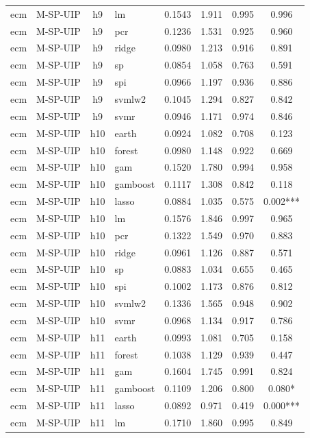 \begin{ThreePartTable}
\begin{longtable}[t]{llclcccc}
ecm & M-SP-UIP & h9 & lm & 0.1543 & 1.911 & 0.995 & 0.996\\
ecm & M-SP-UIP & h9 & pcr & 0.1236 & 1.531 & 0.925 & 0.960\\
ecm & M-SP-UIP & h9 & ridge & 0.0980 & 1.213 & 0.916 & 0.891\\
ecm & M-SP-UIP & h9 & sp & 0.0854 & 1.058 & 0.763 & 0.591\\
ecm & M-SP-UIP & h9 & spi & 0.0966 & 1.197 & 0.936 & 0.886\\
ecm & M-SP-UIP & h9 & svmlw2 & 0.1045 & 1.294 & 0.827 & 0.842\\
ecm & M-SP-UIP & h9 & svmr & 0.0946 & 1.171 & 0.974 & 0.846\\
\addlinespace
ecm & M-SP-UIP & h10 & earth & 0.0924 & 1.082 & 0.708 & 0.123\\
ecm & M-SP-UIP & h10 & forest & 0.0980 & 1.148 & 0.922 & 0.669\\
ecm & M-SP-UIP & h10 & gam & 0.1520 & 1.780 & 0.994 & 0.958\\
ecm & M-SP-UIP & h10 & gamboost & 0.1117 & 1.308 & 0.842 & 0.118\\
ecm & M-SP-UIP & h10 & lasso & 0.0884 & 1.035 & 0.575 & 0.002***\\
ecm & M-SP-UIP & h10 & lm & 0.1576 & 1.846 & 0.997 & 0.965\\
ecm & M-SP-UIP & h10 & pcr & 0.1322 & 1.549 & 0.970 & 0.883\\
ecm & M-SP-UIP & h10 & ridge & 0.0961 & 1.126 & 0.887 & 0.571\\
ecm & M-SP-UIP & h10 & sp & 0.0883 & 1.034 & 0.655 & 0.465\\
ecm & M-SP-UIP & h10 & spi & 0.1002 & 1.173 & 0.876 & 0.812\\
ecm & M-SP-UIP & h10 & svmlw2 & 0.1336 & 1.565 & 0.948 & 0.902\\
ecm & M-SP-UIP & h10 & svmr & 0.0968 & 1.134 & 0.917 & 0.786\\
\addlinespace
ecm & M-SP-UIP & h11 & earth & 0.0993 & 1.081 & 0.705 & 0.158\\
ecm & M-SP-UIP & h11 & forest & 0.1038 & 1.129 & 0.939 & 0.447\\
ecm & M-SP-UIP & h11 & gam & 0.1604 & 1.745 & 0.991 & 0.824\\
ecm & M-SP-UIP & h11 & gamboost & 0.1109 & 1.206 & 0.800 & 0.080*\\
ecm & M-SP-UIP & h11 & lasso & 0.0892 & 0.971 & 0.419 & 0.000***\\
ecm & M-SP-UIP & h11 & lm & 0.1710 & 1.860 & 0.995 & 0.849\\

\end{longtable}
\end{ThreePartTable}
